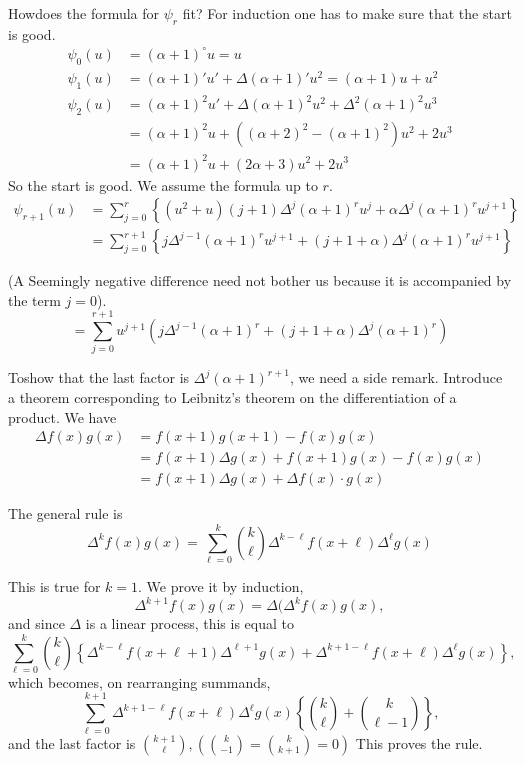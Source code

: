 How\pageoriginale does the formula for $\psi_r$ fit? For induction one has to make
sure that the start is good.
\begin{align*}
  \psi_0 (u) & = (\alpha + 1)^\circ u=u\\
  \psi_1 (u) & = (\alpha +1)' u' + \Delta (\alpha+1)' u^2 =
  (\alpha+1)u+u^2\\
  \psi_2 (u) & = (\alpha +1)^2 u' + \Delta (\alpha+1)^2 u^2 + \Delta^2
  (\alpha+1)^2 u^3\\
  & = (\alpha+1)^2u + \left( (\alpha+2)^2- (\alpha+1)^2 \right)u^2 +
  2u^3\\
  & = (\alpha+1)^2u + (2 \alpha+3)u^2 + 2 u^3
\end{align*}
So the start is good. We assume the formula up to $r$.
\begin{align*}
  \psi_{r+1} (u) & = \sum^r_{j=0} \left\{ (u^2 +u) (j+1) \Delta^j
  (\alpha+1)^r u^j+ \alpha \Delta^j (\alpha+1)^r u^{j+1}\right\}\\
  & = \sum^{r+1}_{j=0} \left\{ j \Delta^{j-1} (\alpha+1)^r u^{j+1} +
  (j+1+\alpha) \Delta^j (\alpha+1)^r u^{j+1}\right\}
\end{align*}

(A Seemingly negative difference need not bother us because it is
accompanied by the term $j=0$).
$$
= \sum^{r+1}_{j=0} u^{j+1} \left( j \Delta^{j-1} (\alpha+1)^r + (j+ 1+
\alpha) \Delta^j (\alpha+1)^r\right)
$$

To\pageoriginale show that the last factor is $\Delta^j (\alpha+1)^{r+1}$, we need a
side remark. Introduce a theorem corresponding to Leibnitz's theorem
on the differentiation of a product. We have
\begin{align*}
  \Delta f(x) g(x) & = f(x+1) g(x+1) - f(x) g(x)\\
  & =f(x+1) \Delta g(x) + f(x+1) g(x) - f(x) g(x)\\
  & = f(x+1) \Delta g(x) + \Delta f(x) \cdot g(x)
\end{align*}

The general rule is 
$$
\Delta^k f(x) g(x) = \sum^k_{\ell =0} \binom k \ell \Delta^{k-\ell}
f(x+\ell) \Delta^\ell g(x)
$$

This is true for $k=1$. We prove it by induction,
$$
\Delta^{k+1} f(x) g(x) = \Delta (\Delta^k f(x) g(x),
$$
and since $\Delta$ is a linear process, this is equal to 
$$
\sum^k_{\ell =0} \binom k \ell \left\{ \Delta^{k- \ell} f(x+ \ell +1)
\Delta ^{\ell +1} g(x) + \Delta ^{k+ 1- \ell} f(x+\ell) \Delta^\ell
g(x) \right\},  
$$
which becomes, on rearranging summands,
$$
\sum^{k+1}_{\ell =0} \Delta^{k+1-\ell} f(x+\ell) \Delta^{\ell} g(x)
  \left\{ \binom k \ell + \binom{k}{\ell -1}
 \right\},
$$
and the last factor is $\binom{k+1}{\ell}, \left( \binom{k}{-1} =
\binom{k}{k+1}=0 \right)$ This proves the rule.

